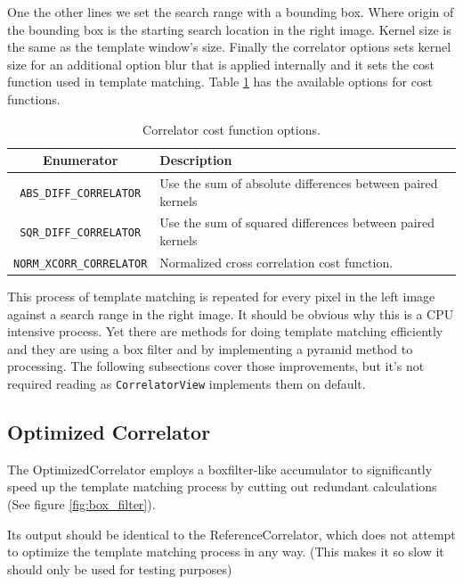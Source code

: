 One the other lines we set the search range with a bounding box. Where
origin of the bounding box is the starting search location in the
right image. Kernel size is the same as the template window's
size. Finally the correlator options sets kernel size for an
additional option blur that is applied internally and it sets the cost
function used in template matching. Table
\ref{tbl:correlator-cost-functions} has the available options for cost
functions.

\begin{table}[htb]\begin{centering}
\begin{tabular}{|c|p{4 in}|} \hline
Enumerator & Description \\ \hline \hline
\verb#ABS_DIFF_CORRELATOR# & Use the sum of absolute differences between paired kernels \\ \hline
\verb#SQR_DIFF_CORRELATOR# & Use the sum of squared differences between paired kernels \\ \hline
\verb#NORM_XCORR_CORRELATOR# & Normalized cross correlation cost function. \\ \hline
\end{tabular}
\caption{Correlator cost function options.}
\label{tbl:correlator-cost-functions}
\end{centering}\end{table}

This process of template matching is repeated for every pixel in the
left image against a search range in the right image. It should be
obvious why this is a CPU intensive process. Yet there are methods for
doing template matching efficiently and they are using a box filter
and by implementing a pyramid method to processing. The following
subsections cover those improvements, but it's not required reading as
{\tt CorrelatorView} implements them on default.

\subsection{Optimized Correlator}

The OptimizedCorrelator employs a boxfilter-like accumulator to significantly
speed up the template matching process by cutting out redundant calculations
(See figure \ref{fig:box_filter}).

Its output should be identical to the ReferenceCorrelator, which does not attempt
to optimize the template matching process in any way.  (This makes it so slow
it should only be used for testing purposes)

